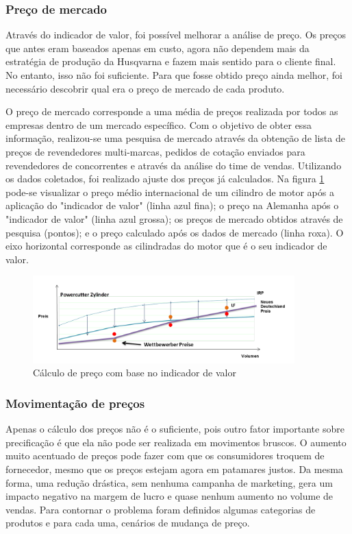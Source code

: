\documentclass[12pt]{article}
\begin{document}
\subsubsection{Preço de mercado}

	Através do indicador de valor, foi possível melhorar a análise de preço. Os preços que antes eram baseados apenas em custo, agora não dependem mais da estratégia de produção da Husqvarna e fazem mais sentido para o cliente final. No entanto, isso não foi suficiente. Para que fosse obtido preço ainda melhor, foi necessário descobrir qual era o preço de mercado de cada produto.

	O preço de mercado corresponde a uma média de preços realizada por todos as empresas dentro de um mercado específico. Com o objetivo de obter essa informação, realizou-se uma pesquisa de mercado através da obtenção de lista de preços de revendedores multi-marcas, pedidos de cotação enviados para revendedores de concorrentes e através da análise do time de vendas. Utilizando os dados coletados, foi realizado ajuste dos preços já calculados. Na figura \ref{fig:competitor} pode-se visualizar o preço médio internacional de um cilindro de motor após a aplicação do "indicador de valor" (linha azul fina); o preço na Alemanha após o "indicador de valor" (linha azul grossa); os preços de mercado obtidos através de pesquisa (pontos); e o preço calculado após os dados de mercado (linha roxa). O eixo horizontal corresponde as cilindradas do motor que é o seu indicador de valor.

\begin{figure}[h!]
	\centering
	\includegraphics[width=0.9\textwidth]{img/wettbewerber.png}
	\caption{Cálculo de preço com base no indicador de valor}
	\label{fig:competitor}
\end{figure}

\subsubsection{Movimentação de preços}

	Apenas o cálculo dos preços não é o suficiente, pois outro fator importante sobre precificação é que ela não pode ser realizada em movimentos bruscos. O aumento muito acentuado de preços pode fazer com que os consumidores troquem de fornecedor, mesmo que os preços estejam agora em patamares justos. Da mesma forma, uma redução drástica, sem nenhuma campanha de marketing, gera um impacto negativo na margem de lucro e quase nenhum aumento no volume de vendas. Para contornar o problema foram definidos algumas categorias de produtos e para cada uma, cenários de mudança de preço.
\end{document}
